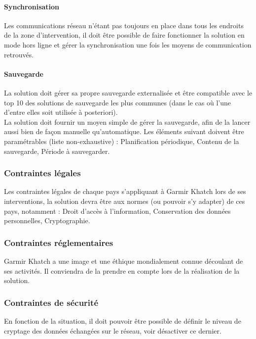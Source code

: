 \documentclass[11pt,fleqn]{book} %
\begin{document}
\paragraph{Synchronisation}
Les communications réseau n'étant pas toujours en place dans tous les endroits de la zone d'intervention, il doit être possible de faire fonctionner la solution en mode \og{}hors ligne\fg{} et gérer la synchronisation une fois les moyens de communication retrouvés.

\paragraph{Sauvegarde}
La solution doit gérer sa propre sauvegarde externalisée et être compatible avec le top 10 des solutions de sauvegarde les plus communes (dans le cas où l'une d'entre elles soit utilisée à posteriori).
\\
La solution doit fournir un moyen simple de gérer la sauvegarde, afin de la lancer aussi bien de façon manuelle qu'automatique. Les éléments suivant doivent être paramétrables (liste non-exhaustive) :
Planification périodique,
Contenu de la sauvegarde,
Période à sauvegarder.

\subsubsection{Contraintes légales}
Les contraintes légales de chaque pays s'appliquant à Garmir Khatch lors de ses interventions, la solution devra être aux normes (ou pouvoir s'y adapter) de ces pays, notamment :
Droit d'accès à l'information,
Conservation des données personnelles,
Cryptographie.

\subsubsection{Contraintes réglementaires}
Garmir Khatch a une image et une éthique mondialement connue découlant de ses activités. Il conviendra de la prendre en compte lors de la réalisation de la solution.

\subsubsection{Contraintes de sécurité}
En fonction de la situation, il doit pouvoir être possible de définir le niveau de cryptage des données échangées sur le réseau, voir désactiver ce dernier.
\end{document}
